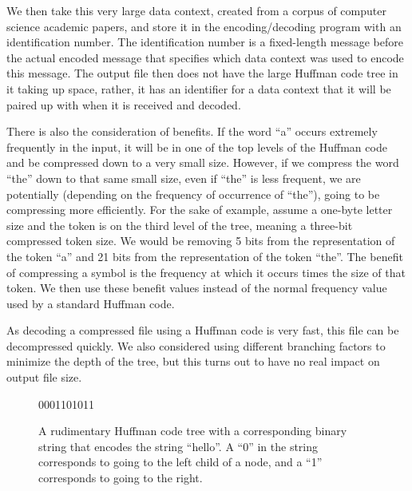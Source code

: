 We then take this very large data context, created from a corpus of computer science academic papers, and store it in the encoding/decoding program with an identification number. The identification number is a fixed-length message before the actual encoded message that specifies which data context was used to encode this message. The output file then does not have the large Huffman code tree in it taking up space, rather, it has an identifier for a data context that it will be paired up with when it is received and decoded.

There is also the consideration of benefits. If the word ``a'' occurs extremely frequently in the input, it will be in one of the top levels of the Huffman code and be compressed down to a very small size. However, if we compress the word ``the'' down to that same small size, even if ``the'' is less frequent, we are potentially (depending on the frequency of occurrence of ``the''), going to be compressing more efficiently. For the sake of example, assume a one-byte letter size and the token is on the third level of the tree, meaning a three-bit compressed token size. We would be removing 5 bits from the representation of the token ``a'' and 21 bits from the representation of the token ``the''. The benefit of compressing a symbol is the frequency at which it occurs times the size of that token. We then use these benefit values instead of the normal frequency value used by a standard Huffman code.

As decoding a compressed file using a Huffman code is very fast, this file can be decompressed quickly.\cite{fastdecode} We also considered using different branching factors to minimize the depth of the tree, but this turns out to have no real impact on output file size. %

\begin{figure}
\centering
    
    0001101011
    
    \caption[Huffman code example]{A rudimentary Huffman code tree with a corresponding binary string that encodes the string ``hello''. A ``0'' in the string corresponds to going to the left child of a node, and a ``1'' corresponds to going to the right. }
    \label{fig:hufftraversal}
\end{figure}


